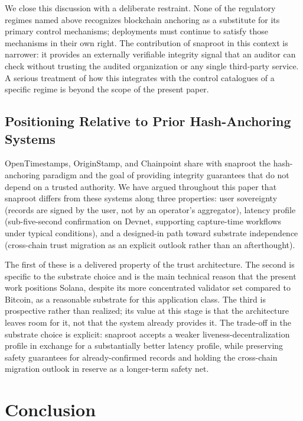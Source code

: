 \documentclass[11pt,a4paper]{article}
\begin{document}
We close this discussion with a deliberate restraint. None of the
regulatory regimes named above recognizes blockchain anchoring as a
substitute for its primary control mechanisms; deployments must
continue to satisfy those mechanisms in their own right. The
contribution of snaproot in this context is narrower: it provides an
externally verifiable integrity signal that an auditor can check
without trusting the audited organization or any single third-party
service. A serious treatment of how this integrates with the control
catalogues of a specific regime is beyond the scope of the present
paper.

\subsection{Positioning Relative to Prior Hash-Anchoring Systems}

OpenTimestamps, OriginStamp, and Chainpoint share with snaproot the
hash-anchoring paradigm and the goal of providing integrity guarantees
that do not depend on a trusted authority. We have argued throughout
this paper that snaproot differs from these systems along three
properties: user sovereignty (records are signed by the user, not by
an operator's aggregator), latency profile (sub-five-second
confirmation on Devnet, supporting capture-time workflows under
typical conditions), and a designed-in path
toward substrate independence (cross-chain trust migration as an
explicit outlook rather than an afterthought).

The first of these is a delivered property of the trust architecture.
The second is specific to the substrate choice and is the main
technical reason that the present work positions Solana, despite its
more concentrated validator set compared to Bitcoin, as a reasonable
substrate for this application class. The third is prospective rather
than realized; its value at this stage is that the architecture leaves
room for it, not that the system already provides it. The trade-off in
the substrate choice is explicit: snaproot accepts a weaker
liveness-decentralization profile in exchange for a substantially
better latency profile, while preserving safety guarantees for
already-confirmed records and holding the cross-chain migration
outlook in reserve as a longer-term safety net.

\section{Conclusion}
\label{sec:conclusion}
\end{document}
